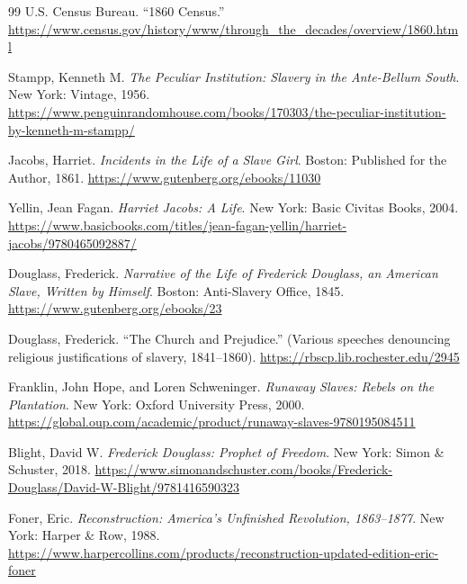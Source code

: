 \documentclass[12pt]{article}
\begin{document}
\begin{thebibliography}{99}
U.S. Census Bureau. 
``1860 Census.''  
\href{https://www.census.gov/history/www/through_the_decades/overview/1860.html}{https://www.census.gov/history/www/through_the_decades/overview/1860.html}

Stampp, Kenneth M. 
\textit{The Peculiar Institution: Slavery in the Ante-Bellum South}. 
New York: Vintage, 1956.  
\href{https://www.penguinrandomhouse.com/books/170303/the-peculiar-institution-by-kenneth-m-stampp/}{https://www.penguinrandomhouse.com/books/170303/the-peculiar-institution-by-kenneth-m-stampp/}

Jacobs, Harriet. 
\textit{Incidents in the Life of a Slave Girl}. 
Boston: Published for the Author, 1861.  
\href{https://www.gutenberg.org/ebooks/11030}{https://www.gutenberg.org/ebooks/11030}

Yellin, Jean Fagan. 
\textit{Harriet Jacobs: A Life}. 
New York: Basic Civitas Books, 2004.  
\href{https://www.basicbooks.com/titles/jean-fagan-yellin/harriet-jacobs/9780465092887/}{https://www.basicbooks.com/titles/jean-fagan-yellin/harriet-jacobs/9780465092887/}

Douglass, Frederick. 
\textit{Narrative of the Life of Frederick Douglass, an American Slave, Written by Himself}.
Boston: Anti-Slavery Office, 1845.  
\href{https://www.gutenberg.org/ebooks/23}{https://www.gutenberg.org/ebooks/23}

Douglass, Frederick. 
``The Church and Prejudice.'' 
(Various speeches denouncing religious justifications of slavery, 1841--1860).  
\href{https://rbscp.lib.rochester.edu/2945}{https://rbscp.lib.rochester.edu/2945}

Franklin, John Hope, and Loren Schweninger.
\textit{Runaway Slaves: Rebels on the Plantation}.
New York: Oxford University Press, 2000.  
\href{https://global.oup.com/academic/product/runaway-slaves-9780195084511}{https://global.oup.com/academic/product/runaway-slaves-9780195084511}

Blight, David W.
\textit{Frederick Douglass: Prophet of Freedom}.
New York: Simon \& Schuster, 2018.  
\href{https://www.simonandschuster.com/books/Frederick-Douglass/David-W-Blight/9781416590323}{https://www.simonandschuster.com/books/Frederick-Douglass/David-W-Blight/9781416590323}

Foner, Eric.
\textit{Reconstruction: America's Unfinished Revolution, 1863--1877}.
New York: Harper \& Row, 1988.  
\href{https://www.harpercollins.com/products/reconstruction-updated-edition-eric-foner}{https://www.harpercollins.com/products/reconstruction-updated-edition-eric-foner}


\end{thebibliography}
\end{document}
